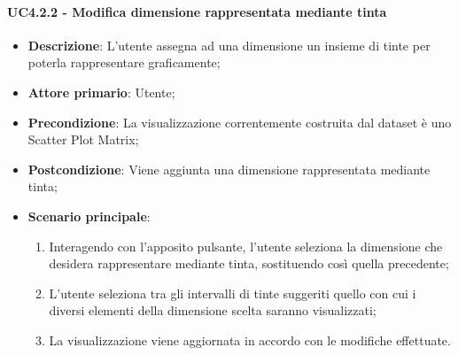 \paragraph{UC4.2.2 - Modifica dimensione rappresentata mediante tinta}
\label{par:uc4.2.2}
\begin{itemize}

    \item \textbf{Descrizione}:     L'utente assegna ad una dimensione un insieme di tinte per poterla rappresentare
                                    graficamente;

    \item \textbf{Attore primario}: Utente;
    \item \textbf{Precondizione}:   La visualizzazione correntemente costruita dal dataset è uno Scatter Plot Matrix;
    \item \textbf{Postcondizione}:  Viene aggiunta una dimensione rappresentata mediante tinta;
    \item \textbf{Scenario principale}:
    \begin{enumerate}

        \item   Interagendo con l'apposito pulsante, l'utente seleziona la dimensione che desidera rappresentare
                mediante tinta, sostituendo così quella precedente;

        \item   L'utente seleziona tra gli intervalli di tinte suggeriti quello con cui i diversi elementi della
                dimensione scelta saranno visualizzati;

        \item   La visualizzazione viene aggiornata in accordo con le modifiche effettuate.
    \end{enumerate}
\end{itemize}

